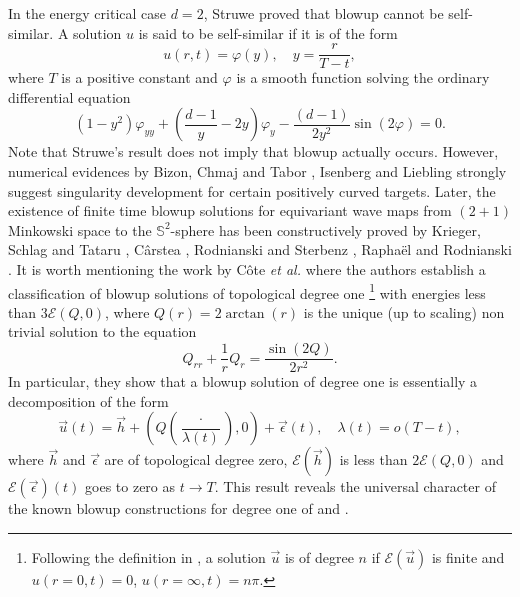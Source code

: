 \documentclass[11pt]{aims}
\theoremstyle{definition}
\numberwithin{equation}{section}
\begin{document}
In the energy critical case $d = 2$, Struwe \cite{Smz02,Scpam03} proved that blowup cannot be self-similar. A solution $u$ is said to be self-similar if it is of the form 
$$u(r,t) = \varphi(y), \quad y = \frac{r}{T-t},$$
where $T$ is a positive constant and $\varphi$ is a smooth function solving the ordinary differential equation
\begin{equation}\label{eq:phi}
(1 - y^2)\varphi_{yy} + \left(\frac{d - 1}{y} - 2y\right)\varphi_y - \frac{(d-1)}{2y^2}\sin(2\varphi) = 0.
\end{equation}
Note that Struwe's result does not imply that blowup actually occurs. However, numerical evidences by Bizon, Chmaj and Tabor \cite{BCTnon01}, Isenberg and Liebling \cite{ILjmp02} strongly suggest singularity development for certain positively curved targets. Later, the existence of finite time blowup solutions for equivariant wave maps from $(2+1)$ Minkowski space to the $\mathbb{S}^2$-sphere  has been constructively proved by Krieger, Schlag and Tataru \cite{KSTim08},  C\^arstea \cite{Ccmp10}, Rodnianski and Sterbenz \cite{RSam10}, Rapha\"el and Rodnianski \cite{RRmihes12}. It is worth mentioning the work by C\^ote \textit{et al.} \cite{CKLSajm15I, CKLSajm15II} where the authors establish a classification of blowup solutions of topological degree one \footnote{Following the definition in \cite{CKLSajm15I}, a solution $\vec u$ is of degree $n$ if ${\mathcal{E}}(\vec u)$ is finite and $u(r=0, t) = 0$, $u(r = \infty, t) = n\pi$.} with energies less than $3{\mathcal{E}}(Q,0)$, where $Q(r) = 2\arctan(r)$ is the unique (up to scaling) non trivial solution to the equation 
$$Q_{rr} + \frac{1}{r}Q_r= \frac{\sin(2Q)}{2r^2}.$$  
In particular, they show that a blowup solution of degree one is essentially a decomposition of the form
$$\vec u(t) = \vec h + \left(Q\left(\frac{\cdot}{\lambda(t)}\right), 0\right)  + \vec \epsilon(t), \quad \lambda(t) = o(T-t),$$
where $\vec h$ and $\vec \epsilon$ are of topological degree zero, ${\mathcal{E}}(\vec h)$ is less than $2{\mathcal{E}}(Q,0)$ and ${\mathcal{E}}(\vec \epsilon)(t)$ goes to zero as $t \to T$.  This result reveals the universal character of the known blowup constructions for degree one of \cite{KSTim08} and \cite{RRmihes12}.\\
\end{document}
